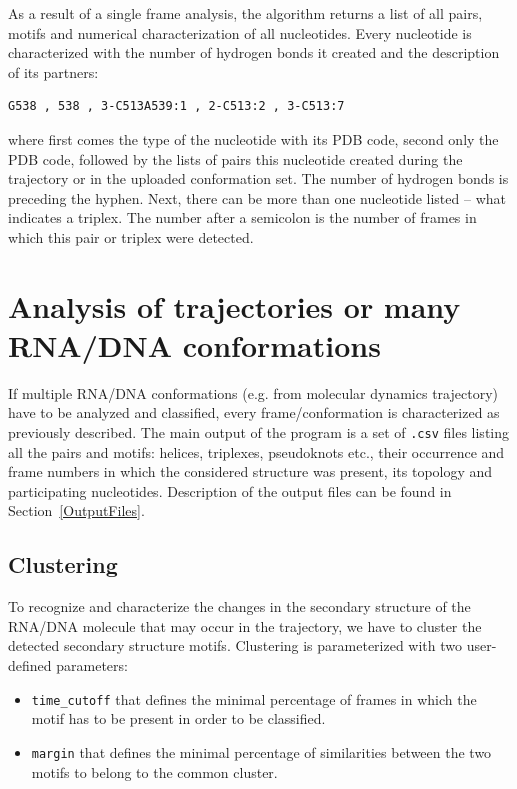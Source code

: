 \documentclass[12pt]{article}
\begin{document}
As a result of a single frame analysis, the algorithm returns a list of all pairs, motifs and numerical characterization of all nucleotides. Every nucleotide is characterized with the number of hydrogen bonds it created and the description of its partners:

\begin{verbatim}
G538 , 538 , 3-C513A539:1 , 2-C513:2 , 3-C513:7
\end{verbatim}

where first comes the type of the nucleotide with its PDB code, second only the PDB code, followed by the lists of pairs this nucleotide created during the trajectory or in the uploaded conformation set. The number of hydrogen bonds is preceding the hyphen. Next, there can be more than one nucleotide listed -- what indicates a triplex. The number after a semicolon is the number of frames in which this pair or triplex were detected.

\newpage
\section{Analysis of trajectories or many RNA/DNA conformations}
If multiple RNA/DNA conformations (e.g. from molecular dynamics trajectory) have to be analyzed and classified, every frame/conformation is characterized as previously described. The main output of the program is a set of {\tt .csv} files listing all the pairs and motifs: helices, triplexes, pseudoknots etc., their occurrence and frame numbers in which the considered structure was present, its topology and participating nucleotides. Description of the output files can be found in Section~\ref{OutputFiles}.

\subsection{Clustering}\label{Clustering}
To recognize and characterize the changes in the secondary structure of the RNA/DNA molecule that may occur in the trajectory, we have to cluster the detected secondary structure motifs. Clustering is parameterized with two user-defined parameters: \\
\begin{itemize}
\item {\tt time\_cutoff} that defines the minimal percentage of frames in which the motif has to be present in order to be classified.
\item {\tt margin} that defines the minimal percentage of similarities between the two motifs to belong to the common cluster. 
\end{itemize}
\end{document}
